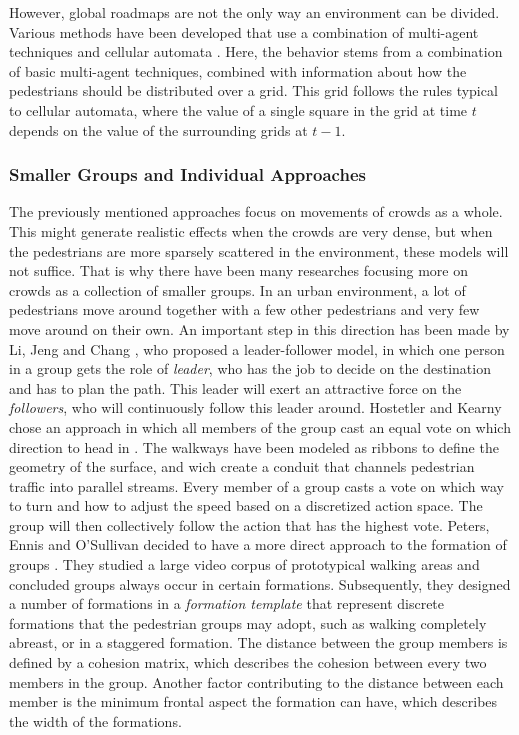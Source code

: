 \documentclass[11pt]{book}
\begin{document}
However, global roadmaps are not the only way an environment can be divided. Various methods have been developed that use a combination of multi-agent techniques and cellular automata \cite{Dijkstra00amulti-agent}\cite{1241047}. Here, the behavior stems from a combination of basic multi-agent techniques, combined with information about how the pedestrians should be distributed over a grid. This grid follows the rules typical to cellular automata, where the value of a single square in the grid at time $t$ depends on the value of the surrounding grids at $t-1$.


\subsubsection{Smaller Groups and Individual Approaches}
The previously mentioned approaches focus on movements of crowds as a whole. This might generate realistic effects when the crowds are very dense, but when the pedestrians are more sparsely scattered in the environment, these models will not suffice. That is why there have been many researches focusing more on crowds as a collection of smaller groups. In an urban environment, a lot of pedestrians move around together with a few other pedestrians and very few move around on their own. An important step in this direction has been made by Li, Jeng and Chang \cite{leaderfollower}, who proposed a leader-follower model, in which one person in a group gets the role of \emph{leader}, who has the job to decide on the destination and has to plan the path. This leader will exert an attractive force on the \emph{followers}, who will continuously follow this leader around. Hostetler and Kearny chose an approach in which all members of the group cast an equal vote on which direction to head in \cite{Hostetler02strollingdown}. The walkways have been modeled as ribbons to define the geometry of the surface, and wich create a conduit that channels pedestrian traffic into parallel streams. Every member of a group casts a vote on which way to turn and how to adjust the speed based on a discretized action space. The group will then collectively follow the action that has the highest vote. Peters, Ennis and O'Sullivan decided to have a more direct approach to the formation of groups \cite{10.1109MCG.2009.69}. They studied a large video corpus of prototypical walking areas and concluded groups always occur in certain formations. Subsequently, they designed a number of formations in a \emph{formation template} that represent discrete formations that the pedestrian groups may adopt, such as walking completely abreast, or in a staggered formation. The distance between the group members is defined by a cohesion matrix, which describes the cohesion between every two members in the group. Another factor contributing to the distance between each member is the minimum frontal aspect the formation can have, which describes the width of the formations.\\
\end{document}
